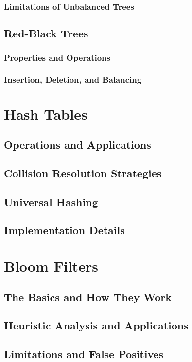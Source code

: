 \documentclass[12pt]{book} %
\begin{document}
\subsubsection{Limitations of Unbalanced Trees}
\subsection{Red-Black Trees}
\subsubsection{Properties and Operations}
\subsubsection{Insertion, Deletion, and Balancing}

\section{Hash Tables}
\subsection{Operations and Applications}
\subsection{Collision Resolution Strategies}
\subsection{Universal Hashing}
\subsection{Implementation Details}

\section{Bloom Filters}
\subsection{The Basics and How They Work}
\subsection{Heuristic Analysis and Applications}
\subsection{Limitations and False Positives}
\end{document}
